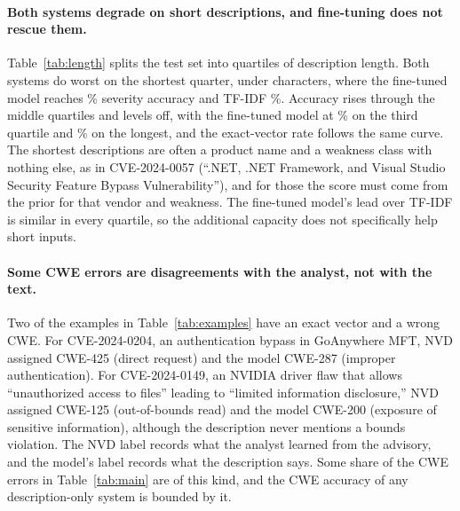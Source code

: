 \paragraph{Both systems degrade on short descriptions, and fine-tuning does not rescue them.}
Table~\ref{tab:length} splits the test set into quartiles of description length.
Both systems do worst on the shortest quarter, under \nLenBB{} characters, where the fine-tuned model reaches \nLoRAfSevQA\% severity accuracy and TF-IDF \nLRfSevQA\%.
Accuracy rises through the middle quartiles and levels off, with the fine-tuned model at \nLoRAfSevQC\% on the third quartile and \nLoRAfSevQD\% on the longest, and the exact-vector rate follows the same curve.
The shortest descriptions are often a product name and a weakness class with nothing else, as in CVE-2024-0057 (``.NET, .NET Framework, and Visual Studio Security Feature Bypass Vulnerability''), and for those the score must come from the prior for that vendor and weakness.
The fine-tuned model's lead over TF-IDF is similar in every quartile, so the additional capacity does not specifically help short inputs.



\paragraph{Some CWE errors are disagreements with the analyst, not with the text.}
Two of the examples in Table~\ref{tab:examples} have an exact vector and a wrong CWE.
For CVE-2024-0204, an authentication bypass in GoAnywhere MFT, NVD assigned CWE-425 (direct request) and the model CWE-287 (improper authentication).
For CVE-2024-0149, an NVIDIA driver flaw that allows ``unauthorized access to files'' leading to ``limited information disclosure,'' NVD assigned CWE-125 (out-of-bounds read) and the model CWE-200 (exposure of sensitive information), although the description never mentions a bounds violation.
The NVD label records what the analyst learned from the advisory, and the model's label records what the description says.
Some share of the CWE errors in Table~\ref{tab:main} are of this kind, and the CWE accuracy of any description-only system is bounded by it.

